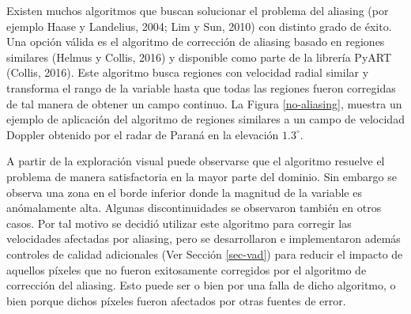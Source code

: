 \documentclass[12pt,spanish,oneside, a4paper]{book}
\begin{document}
Existen muchos algoritmos que buscan solucionar el problema del aliasing
(por ejemplo Haase y Landelius, 2004; Lim y Sun, 2010) con distinto
grado de éxito. Una opción válida es el algoritmo de corrección de
aliasing basado en regiones similares (Helmus y Collis, 2016) y
disponible como parte de la librería PyART (Collis, 2016). Este
algoritmo busca regiones con velocidad radial similar y transforma el
rango de la variable hasta que todas las regiones fueron corregidas de
tal manera de obtener un campo continuo. La Figura \ref{no-aliasing},
muestra un ejemplo de aplicación del algoritmo de regiones similares a
un campo de velocidad Doppler obtenido por el radar de Paraná en la
elevación \(1.3^{\circ}\).

A partir de la exploración visual puede observarse que el algoritmo
resuelve el problema de manera satisfactoria en la mayor parte del
dominio. Sin embargo se observa una zona en el borde inferior donde la
magnitud de la variable es anómalamente alta. Algunas discontinuidades
se observaron también en otros casos. Por tal motivo se decidió utilizar
este algoritmo para corregir las velocidades afectadas por aliasing,
pero se desarrollaron e implementaron además controles de calidad
adicionales (Ver Sección \ref{sec-vad}) para reducir el impacto de
aquellos píxeles que no fueron exitosamente corregidos por el algoritmo
de corrección del aliasing. Esto puede ser o bien por una falla de dicho
algoritmo, o bien porque dichos píxeles fueron afectados por otras
fuentes de error.
\end{document}
